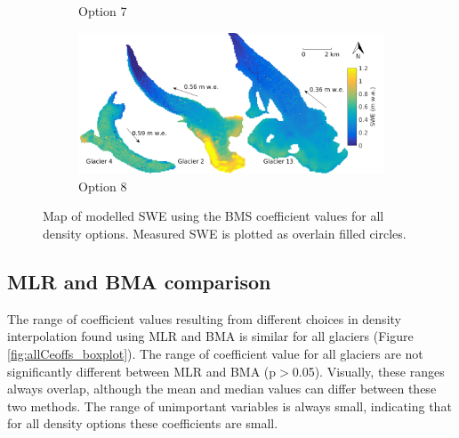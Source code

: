 \documentclass{sfuthesis}
\begin{document}
\begin{figure}[H]
\begin{subfigure}[b]{0.475\textwidth}
            \caption[]%
            {{\small Option 7}}    
        \end{subfigure}
        \quad
        \begin{subfigure}[b]{0.475\textwidth}   
            \centering 
            \includegraphics[width=\textwidth]{BMSmap_Modelled_Observed_Opt8.png}
            \caption[]%
            {{\small Option 8}}    
        \end{subfigure}
              
        \caption[Map of modelled SWE using the BMS coefficient values for all density options. Measured SWE is plotted as overlain filled circles.]
        {\small Map of modelled SWE using the BMS coefficient values for all density options. Measured SWE is plotted as overlain filled circles.} 
        \label{fig:allBMSmodelled}
    \end{figure}




\subsection{MLR and BMA comparison}

The range of coefficient values resulting from different choices in density interpolation found using MLR and BMA is similar for all glaciers (Figure \ref{fig:allCeoffs_boxplot}). The range of coefficient value for all glaciers are not significantly different between MLR and BMA (p$>$0.05). Visually, these ranges always overlap, although the mean and median values can differ between these two methods. The range of unimportant variables is always small, indicating that for all density options these coefficients are small. 
\end{document}
